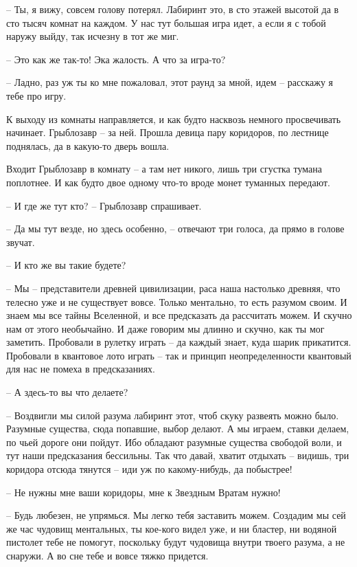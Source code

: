 \documentclass[ebook,oneside,final,openright]{memoir}
\begin{document}
– Ты, я вижу, совсем голову потерял. Лабиринт это, в сто этажей высотой да в сто тысяч комнат на каждом. У нас тут большая игра идет, а если я с тобой наружу выйду, так исчезну в тот же миг.\par
– Это как же так-то! Эка жалость. А что за игра-то?\par
– Ладно, раз уж ты ко мне пожаловал, этот раунд за мной, идем – расскажу я тебе про игру.\par
\par
К выходу из комнаты направляется, и как будто насквозь немного просвечивать начинает. Грыблозавр – за ней. Прошла девица пару коридоров, по лестнице поднялась, да в какую-то дверь вошла. \par
Входит Грыблозавр в комнату – а там нет никого, лишь три сгустка тумана поплотнее. И как будто двое одному что-то вроде монет туманных передают.\par
– И где же тут кто? – Грыблозавр спрашивает.\par
– Да мы тут везде, но здесь особенно, – отвечают три голоса, да прямо в голове звучат.\par
– И кто же вы такие будете?\par
– Мы – представители древней цивилизации, раса наша настолько древняя, что телесно уже и не существует вовсе. Только ментально, то есть разумом своим. И знаем мы все тайны Вселенной, и все предсказать да рассчитать можем. И скучно нам от этого необычайно. И даже говорим мы длинно и скучно, как ты мог заметить. Пробовали в рулетку играть – да каждый знает, куда шарик прикатится. Пробовали в квантовое лото играть – так и принцип неопределенности квантовый для нас не помеха в предсказаниях.\par
– А здесь-то вы что делаете?\par
– Воздвигли мы силой разума лабиринт этот, чтоб скуку развеять можно было. Разумные существа, сюда попавшие, выбор делают. А мы играем, ставки делаем, по чьей дороге они пойдут. Ибо обладают разумные существа свободой воли, и тут наши предсказания бессильны. Так что давай, хватит отдыхать – видишь, три коридора отсюда тянутся – иди уж по какому-нибудь, да побыстрее!\par
– Не нужны мне ваши коридоры, мне к Звездным Вратам нужно!\par
– Будь любезен, не упрямься. Мы легко тебя заставить можем. Создадим мы сей же час чудовищ ментальных, ты кое-кого видел уже, и ни бластер, ни водяной пистолет тебе не помогут, поскольку будут чудовища внутри твоего разума, а не снаружи. А во сне тебе и вовсе тяжко придется.\par
\end{document}
